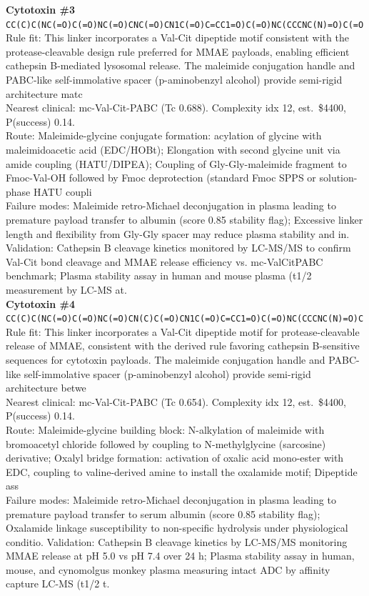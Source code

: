 \documentclass[10pt]{article}
\begin{document}
\noindent\textbf{Cytotoxin \#3} \\ \texttt{CC(C)C(NC(=O)C(=O)NC(=O)CNC(=O)CN1C(=O)C=CC1=O)C(=O)NC(CCCNC(N)=O)C(=O} \\ Rule fit: This linker incorporates a Val-Cit dipeptide motif consistent with the protease-cleavable design rule preferred for MMAE payloads, enabling efficient cathepsin B-mediated lysosomal release. The maleimide conjugation handle and PABC-like self-immolative spacer (p-aminobenzyl alcohol) provide semi-rigid architecture matc \\ Nearest clinical: mc-Val-Cit-PABC (Tc 0.688). Complexity idx 12, est.\ \$4400, P(success) 0.14. \\ Route: Maleimide-glycine conjugate formation: acylation of glycine with maleimidoacetic acid (EDC/HOBt); Elongation with second glycine unit via amide coupling (HATU/DIPEA); Coupling of Gly-Gly-maleimide fragment to Fmoc-Val-OH followed by Fmoc deprotection (standard Fmoc SPPS or solution-phase HATU coupli \\ Failure modes: Maleimide retro-Michael deconjugation in plasma leading to premature payload transfer to albumin (score 0.85 stability flag); Excessive linker length and flexibility from Gly-Gly spacer may reduce plasma stability and in. Validation: Cathepsin B cleavage kinetics monitored by LC-MS/MS to confirm Val-Cit bond cleavage and MMAE release efficiency vs. mc-ValCitPABC benchmark; Plasma stability assay in human and mouse plasma (t1/2 measurement by LC-MS at. \\[0.4em]
\noindent\textbf{Cytotoxin \#4} \\ \texttt{CC(C)C(NC(=O)C(=O)NC(=O)CN(C)C(=O)CN1C(=O)C=CC1=O)C(=O)NC(CCCNC(N)=O)C} \\ Rule fit: This linker incorporates a Val-Cit dipeptide motif for protease-cleavable release of MMAE, consistent with the derived rule favoring cathepsin B-sensitive sequences for cytotoxin payloads. The maleimide conjugation handle and PABC-like self-immolative spacer (p-aminobenzyl alcohol) provide semi-rigid architecture betwe \\ Nearest clinical: mc-Val-Cit-PABC (Tc 0.654). Complexity idx 12, est.\ \$4400, P(success) 0.14. \\ Route: Maleimide-glycine building block: N-alkylation of maleimide with bromoacetyl chloride followed by coupling to N-methylglycine (sarcosine) derivative; Oxalyl bridge formation: activation of oxalic acid mono-ester with EDC, coupling to valine-derived amine to install the oxalamide motif; Dipeptide ass \\ Failure modes: Maleimide retro-Michael deconjugation in plasma leading to premature payload transfer to serum albumin (score 0.85 stability flag); Oxalamide linkage susceptibility to non-specific hydrolysis under physiological conditio. Validation: Cathepsin B cleavage kinetics by LC-MS/MS monitoring MMAE release at pH 5.0 vs pH 7.4 over 24 h; Plasma stability assay in human, mouse, and cynomolgus monkey plasma measuring intact ADC by affinity capture LC-MS (t1/2 t. \\[0.4em]
\end{document}

